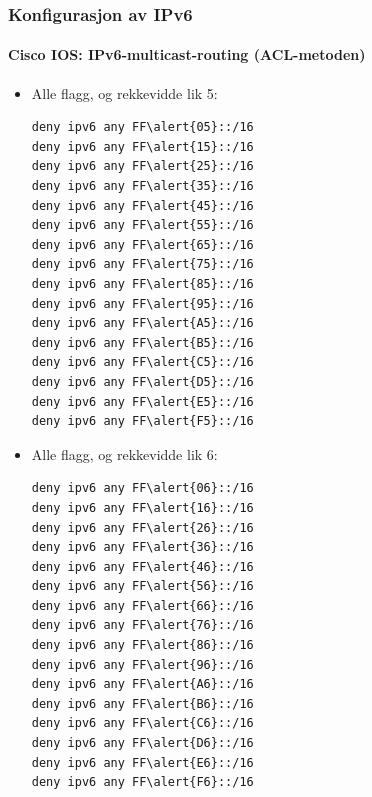 \begin{frame}[fragile]
  \frametitle{Konfigurasjon av IPv6}
  \framesubtitle{Cisco IOS: IPv6-multicast-routing (ACL-metoden)}
  \begin{multicols}{2}
    \begin{itemize}
    \item Alle flagg, og rekkevidde lik 5:
\begin{Verbatim}[commandchars=\\\{\},fontsize=\scriptsize]
deny ipv6 any FF\alert{05}::/16
deny ipv6 any FF\alert{15}::/16
deny ipv6 any FF\alert{25}::/16
deny ipv6 any FF\alert{35}::/16
deny ipv6 any FF\alert{45}::/16
deny ipv6 any FF\alert{55}::/16
deny ipv6 any FF\alert{65}::/16
deny ipv6 any FF\alert{75}::/16
deny ipv6 any FF\alert{85}::/16
deny ipv6 any FF\alert{95}::/16
deny ipv6 any FF\alert{A5}::/16
deny ipv6 any FF\alert{B5}::/16
deny ipv6 any FF\alert{C5}::/16
deny ipv6 any FF\alert{D5}::/16
deny ipv6 any FF\alert{E5}::/16
deny ipv6 any FF\alert{F5}::/16
\end{Verbatim}
    \item Alle flagg, og rekkevidde lik 6:
\begin{Verbatim}[commandchars=\\\{\},fontsize=\scriptsize]
deny ipv6 any FF\alert{06}::/16
deny ipv6 any FF\alert{16}::/16
deny ipv6 any FF\alert{26}::/16
deny ipv6 any FF\alert{36}::/16
deny ipv6 any FF\alert{46}::/16
deny ipv6 any FF\alert{56}::/16
deny ipv6 any FF\alert{66}::/16
deny ipv6 any FF\alert{76}::/16
deny ipv6 any FF\alert{86}::/16
deny ipv6 any FF\alert{96}::/16
deny ipv6 any FF\alert{A6}::/16
deny ipv6 any FF\alert{B6}::/16
deny ipv6 any FF\alert{C6}::/16
deny ipv6 any FF\alert{D6}::/16
deny ipv6 any FF\alert{E6}::/16
deny ipv6 any FF\alert{F6}::/16
\end{Verbatim}
    \end{itemize}
  \end{multicols}
\end{frame}

